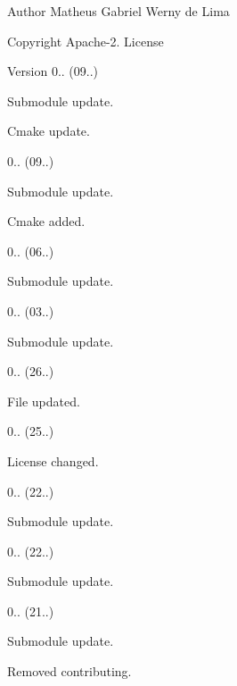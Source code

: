 \begin{DoxyAuthor}{Author}
Matheus Gabriel Werny de Lima 
\end{DoxyAuthor}
\begin{DoxyCopyright}{Copyright}
Apache-\/2. License 
\end{DoxyCopyright}
\begin{DoxyVersion}{Version}
0.. (09..)
\begin{DoxyItemize}
\item Submodule update.
\item Cmake update. 
\end{DoxyItemize}

0.. (09..)
\begin{DoxyItemize}
\item Submodule update.
\item Cmake added. 
\end{DoxyItemize}

0.. (06..)
\begin{DoxyItemize}
\item Submodule update. 
\end{DoxyItemize}

0.. (03..)
\begin{DoxyItemize}
\item Submodule update. 
\end{DoxyItemize}

0.. (26..)
\begin{DoxyItemize}
\item File updated. 
\end{DoxyItemize}

0.. (25..)
\begin{DoxyItemize}
\item License changed. 
\end{DoxyItemize}

0.. (22..)
\begin{DoxyItemize}
\item Submodule update. 
\end{DoxyItemize}

0.. (22..)
\begin{DoxyItemize}
\item Submodule update. 
\end{DoxyItemize}

0.. (21..)
\begin{DoxyItemize}
\item Submodule update.
\item Removed contributing. 
\end{DoxyItemize}


\end{DoxyVersion}
